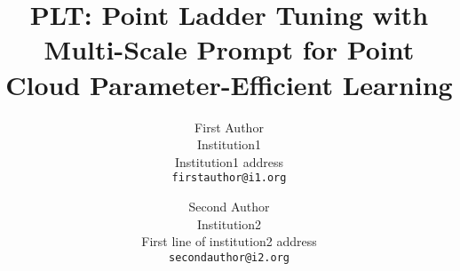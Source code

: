 \documentclass[10pt,twocolumn,letterpaper]{article}
\title{PLT: Point Ladder Tuning with Multi-Scale Prompt for Point Cloud Parameter-Efficient Learning}
\author{First Author\\
Institution1\\
Institution1 address\\
{\tt\small firstauthor@i1.org}
\and
Second Author\\
Institution2\\
First line of institution2 address\\
{\tt\small secondauthor@i2.org}
}
\begin{document}
\maketitle
  






{
    \small
    
    
}

\end{document}
